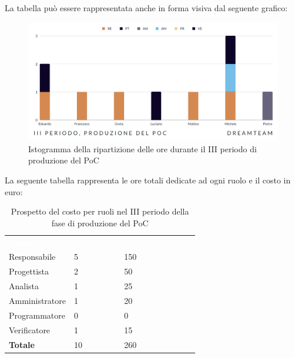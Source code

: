 La tabella può essere rappresentata anche in forma visiva dal seguente grafico:
\begin{figure}[H]
\centering
\includegraphics[scale=0.65]{Sezioni/SezioniPreventivo/grafici/Poc_III_periodo.png}
\caption{Istogramma della ripartizione delle ore durante il III periodo di produzione del PoC}
\end{figure}

La seguente tabella rappresenta le ore totali dedicate ad ogni ruolo e il costo in euro:

\begin{table}[H]
\begin{center}
\renewcommand{\arraystretch}{1.5}
\begin{tabular}{ m{}<{\centering}  m{}<{\centering} m{}<{\centering}}
	\rowcolor{darkblue}
	\textcolor{white}{\textbf{Ruolo}}&\textcolor{white}{\textbf{Totale ore}}&\textcolor{white}{\textbf{Costo totale (\euro)}}\\ 

	Responsabile  & 5 & 150\\	
	
	Progettista & 2 & 50\\
	
	Analista & 1 & 25 \\

	Amministratore & 1 & 20 \\
	
	Programmatore & 0 & 0 \\
	
	Verificatore & 1 & 15 \\
	
	\textbf{Totale} & 10 & 260 \\
	
\end{tabular}
\caption{Prospetto del costo per ruoli nel III periodo della fase di produzione del PoC}
\end{center}
\end{table}

